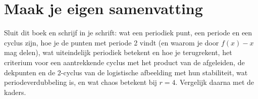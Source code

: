 
\ifzelfstudie
\section*{Maak je eigen samenvatting}
Sluit dit boek en schrijf in je schrift: wat een periodiek punt, een periode en een cyclus zijn, hoe je de punten met periode 2 vindt (en waarom je door $f(x) - x$ mag delen), wat uiteindelijk periodiek betekent en hoe je terugrekent, het criterium voor een aantrekkende cyclus met het product van de afgeleiden, de dekpunten en de 2-cyclus van de logistische afbeelding met hun stabiliteit, wat periodeverdubbeling is, en wat chaos betekent bij $r = 4$. Vergelijk daarna met de kaders.
\fi
